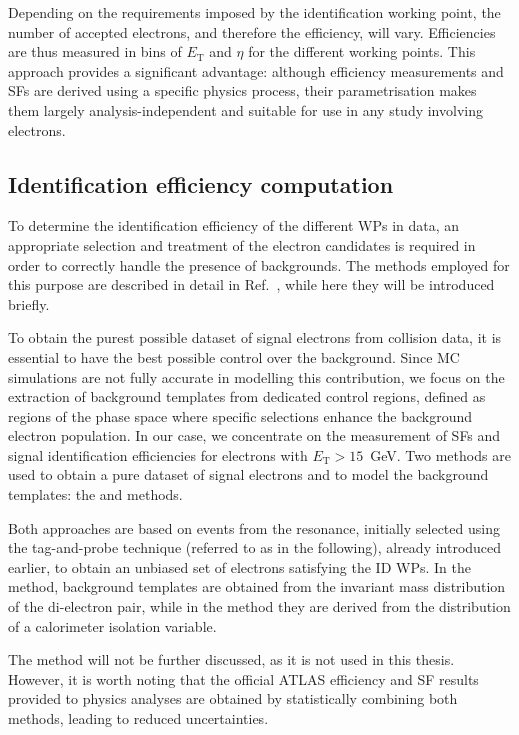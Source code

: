 Depending on the requirements imposed by the identification working point, the number of accepted electrons, and therefore the efficiency, will vary. Efficiencies are thus measured in bins of $E_{\text{T}}$ and $\eta$ for the different working points. This approach provides a significant advantage: although efficiency measurements and SFs are derived using a specific physics process, their parametrisation makes them largely analysis-independent and suitable for use in any study involving electrons.

\subsection{Identification efficiency computation}
To determine the identification efficiency of the different WPs in data, an appropriate selection and treatment of the electron candidates is required in order to correctly handle the presence of backgrounds. The methods employed for this purpose are described in detail in Ref.~\cite{latest_electron_paper_2024}, while here they will be introduced briefly.

To obtain the purest possible dataset of signal electrons from collision data, it is essential to have the best possible control over the background. Since MC simulations are not fully accurate in modelling this contribution, we focus on the extraction of background templates from dedicated control regions, defined as regions of the phase space where specific selections enhance the background electron population. In our case, we concentrate on the measurement of SFs and signal identification efficiencies for electrons with $E_{\mathrm{T}} > 15$~GeV. Two methods are used to obtain a pure dataset of signal electrons and to model the background templates: the \zmass and \ziso methods.

Both approaches are based on events from the \zee resonance, initially selected using the tag-and-probe technique (referred to as \tp in the following), already introduced earlier, to obtain an unbiased set of electrons satisfying the ID WPs. In the \zmass method, background templates are obtained from the invariant mass distribution of the di-electron pair, while in the \ziso method they are derived from the distribution of a calorimeter isolation variable.

The \ziso method will not be further discussed, as it is not used in this thesis. However, it is worth noting that the official ATLAS efficiency and SF results provided to physics analyses are obtained by statistically combining both methods, leading to reduced uncertainties. 

